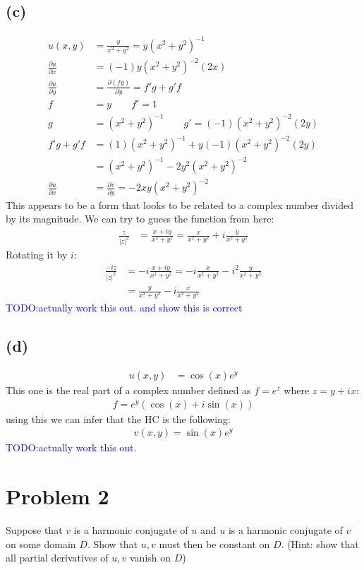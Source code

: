 \documentclass{article}
\newcommand{\todo}[1]{\textcolor{blue}{TODO:#1}}
\let\oldcos\cos
\let\oldsin\sin
\renewcommand{\cos}[1]{\oldcos\left(#1\right)}
\renewcommand{\sin}[1]{\oldsin\left(#1\right)}
\newcommand{\parder}[2]{\frac{\partial#1}{\partial#2}}
\begin{document}
\subsection*{(c)}
\begin{align*}
  u(x,y) &= \frac{y}{x^2+y^2} = y(x^2+y^2)^{-1}\\
  \parder{u}{x} &= (-1)y(x^2+y^2)^{-2}(2x)\\
  \parder{u}{y} &= \parder{(fg)}{y} = f'g+g'f\\
  f &= y \quad \quad f' = 1\\
  g &= (x^2+y^2)^{-1} \quad \quad g' = (-1)(x^2+y^2)^{-2}(2y)\\
  f'g+g'f &= (1)(x^2+y^2)^{-1} + y(-1)(x^2+y^2)^{-2}(2y) \\
         &= (x^2+y^2)^{-1} - 2y^2(x^2+y^2)^{-2}\\
  \parder{u}{x} &= \parder{v}{y} = -2xy(x^2+y^2)^{-2}
\end{align*}
This appears to be a form that looks to be related to a complex number divided by its magnitude. We can try to guess the function from here:
\begin{align*}
  \frac{z}{|z|^2} &= \frac{x+iy}{x^2+y^2} = \frac{x}{x^2+y^2} + i\frac{y}{x^2+y^2}
\end{align*}
Rotating it by $i$:
\begin{align*}
  \frac{-iz}{|z|^2} &= -i\frac{x+iy}{x^2+y^2} = -i\frac{x}{x^2+y^2} -i^2\frac{y}{x^2+y^2}\\
  &= \frac{y}{x^2+y^2}-i\frac{x}{x^2+y^2}
\end{align*}
\todo{actually work this out. and show this is correct}
\subsection*{(d)}
\begin{align*}
  u(x,y) &= \cos{x}e^y
\end{align*}
This one is the real part of a complex number defined as $f = e^z$ where $z = y+ix$:
\begin{align*}
  f = e^y(\cos{x}+i\sin{x})
\end{align*}
using this we can infer that the HC is the following:
\begin{align*}
  v(x,y) = \sin{x}e^y
\end{align*}
\todo{actually work this out.}
\newpage
\section*{Problem 2}
Suppose that $v$ is a harmonic conjugate of $u$ and $u$ is a harmonic conjugate of $v$ on some domain $D$. Show that $u,v$ must then be constant on $D$. (Hint: show that all partial derivatives of $u,v$ vanish on $D$)
\end{document}
